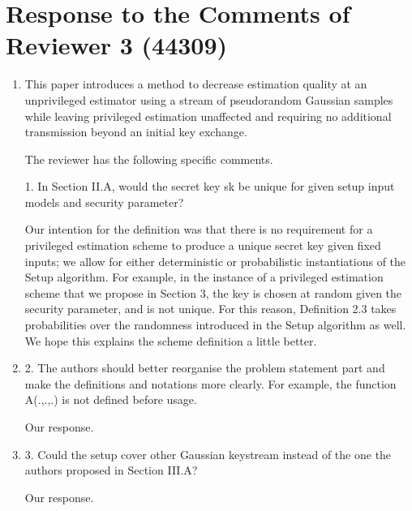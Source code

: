 \documentclass[a4paper]{scrartcl}
\newenvironment{rebuttal}{\begin{enumerate}[label={\color{grey}\thesection.\arabic{enumi}},leftmargin=0pt,ref=\thesection.\arabic{enumi}]}{\end{enumerate}}
\newcommand{\reviewtext}[1]{{\color{nblue} #1}}
\begin{document}



\section*{Response to the Comments of Reviewer 3 (44309)}
\def\thesection{R3}
\begin{rebuttal}
\item \reviewtext{This paper introduces a method to decrease estimation quality at an unprivileged estimator using a stream of pseudorandom Gaussian samples while leaving privileged estimation unaffected and requiring no additional transmission beyond an initial key exchange.

The reviewer has the following specific comments.

1. In Section II.A, would the secret key sk be unique for given setup input models and security parameter?}

Our intention for the definition was that there is no requirement for a privileged estimation scheme to produce a unique secret key given fixed inputs; we allow for either deterministic or probabilistic instantiations of the Setup algorithm. For example, in the instance of a privileged estimation scheme that we propose in Section 3, the key is chosen at random given the security parameter, and is not unique. For this reason, Definition 2.3 takes probabilities over the randomness introduced in the Setup algorithm as well. We hope this explains the scheme definition a little better.

\item \reviewtext{2. The authors should better reorganise the problem statement part and make the definitions and notations more clearly. For example, the function A(.,.,.) is not defined before usage.}

Our response.

\item \reviewtext{3. Could the setup cover other Gaussian keystream instead of the one the authors proposed in Section III.A?}

Our response.

\end{rebuttal}


\end{document}
